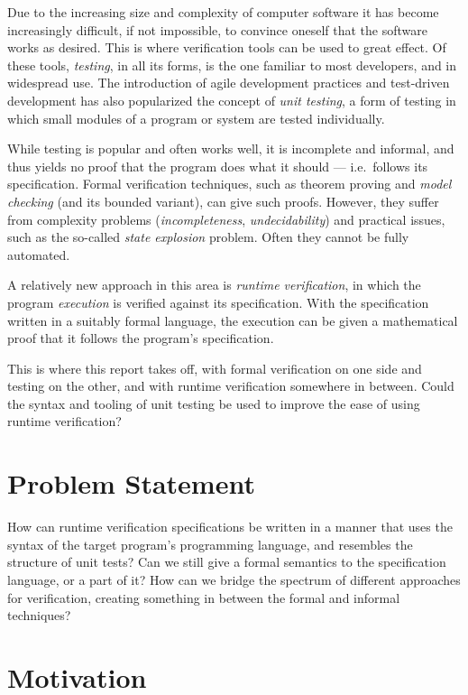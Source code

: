 \documentclass[a4paper,11pt]{kth-mag}
\begin{document}
Due to the increasing size and complexity of computer software it has become
increasingly difficult, if not impossible, to convince oneself that the
software works as desired. This is where verification tools can be used to
great effect. Of these tools, \textit{testing}, in all its forms, is the one
familiar to most developers, and in widespread use. The introduction of agile
development practices and test-driven development has also popularized the
concept of \textit{unit testing}, a form of testing in which small modules of a
program or system are tested individually.

While testing is popular and often works well, it is incomplete and informal,
and thus yields no proof that the program does what it should --- i.e.\ follows
its specification. Formal verification techniques, such as theorem proving and
\textit{model checking} (and its bounded variant), can give such proofs.
However, they suffer from complexity problems (\textit{incompleteness},
\textit{undecidability}) and practical issues, such as the so-called
\textit{state explosion} problem. Often they cannot be fully automated.

A relatively new approach in this area is \textit{runtime verification}, in
which the program \textit{execution} is verified against its specification.
With the specification written in a suitably formal language, the execution can
be given a mathematical proof that it follows the program's specification.

This is where this report takes off, with formal verification on one side and
testing on the other, and with runtime verification somewhere in between. Could
the syntax and tooling of unit testing be used to improve the ease of using
runtime verification?


\section{Problem Statement} \label{section-problem-statement}

How can runtime verification specifications be written in a manner that uses
the syntax of the target program's programming language, and resembles the
structure of unit tests? Can we still give a formal semantics to the
specification language, or a part of it? How can we bridge the spectrum of
different approaches for verification, creating something in between the formal
and informal techniques?


\section{Motivation}
\end{document}
